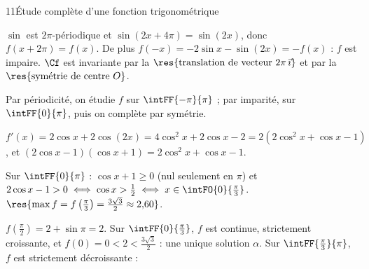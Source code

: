 \begin{corrige}{11}{Étude complète d'une fonction trigonométrique}
\begin{questions}
  \item $\sin$ est $2\pi$-périodique et $\sin(2x+4\pi)=\sin(2x)$, donc $f(x+2\pi)=f(x)$. De plus
    $f(-x)=-2\sin x-\sin(2x)=-f(x)$ : $f$ est impaire. $\Cf$ est invariante par la $\res{\text{translation de vecteur }2\pi\,\vec\imath}$
    et par la $\res{\text{symétrie de centre }O}$.
  \item Par périodicité, on étudie $f$ sur $\intFF{-\pi}{\pi}$ ; par imparité, sur $\intFF{0}{\pi}$, puis on complète par symétrie.
\end{questions}
\noindent
\begin{minipage}[t]{0.54\linewidth}\vspace{0pt}\raggedright
\begin{questions}[resume]
  \item $f'(x)=2\cos x+2\cos(2x)=4\cos^{2}x+2\cos x-2=2\left(2\cos^{2}x+\cos x-1\right)$, et
    $(2\cos x-1)(\cos x+1)=2\cos^{2}x+\cos x-1$.
  \item Sur $\intFF{0}{\pi}$ : $\cos x+1\geq0$ (nul seulement en $\pi$) et $2\cos x-1>0\iff\cos x>\frac12\iff x\in\intFO{0}{\frac{\pi}{3}}$.
    $\res{\max f=f\left(\frac{\pi}{3}\right)=\frac{3\sqrt3}{2}\approx2{,}60}$.
\end{questions}
\end{minipage}\hfill
\begin{minipage}[t]{0.42\linewidth}\vspace{1mm}
\centering
\begin{tableau}
\end{tableau}
\end{minipage}
\noindent
\begin{minipage}[t]{0.5\linewidth}\vspace{0pt}\raggedright
\begin{questions}[start=5]
  \item $f\left(\frac{\pi}{2}\right)=2+\sin\pi=2$. Sur $\intFF{0}{\frac{\pi}{3}}$, $f$ est continue, strictement croissante, et
    $f(0)=0<2<\frac{3\sqrt3}{2}$ : une unique solution $\alpha$. Sur $\intFF{\frac{\pi}{3}}{\pi}$, $f$ est strictement décroissante :

\end{questions}
\end{minipage}
\end{corrige}
